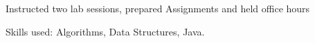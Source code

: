     \begin{tightemize}
      \item Instructed two lab sessions, prepared Assignments and held office hours
      \item Skills used: Algorithms, Data Structures, Java.
    \end{tightemize}
    \sectionsep
